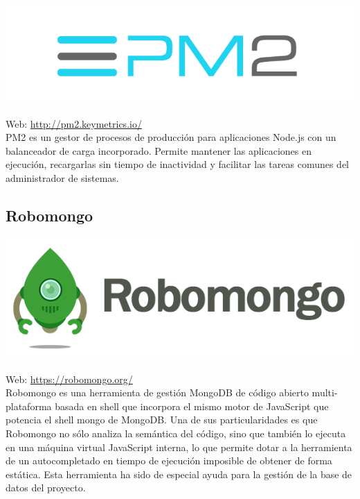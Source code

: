 \begin{center}
\includegraphics[scale=0.4]{imagenes/pm2-logo.png}
\end{center}

Web: \url{http://pm2.keymetrics.io/}\\


PM2 es un gestor de procesos de producción para aplicaciones Node.js con un balanceador de carga incorporado. Permite mantener las aplicaciones en ejecución, recargarlas sin tiempo de inactividad
y facilitar las tareas comunes del administrador de sistemas.


\subsection{ Robomongo }

\begin{center}
\includegraphics[scale=0.5]{imagenes/robomongo-logo.png}
\end{center}

Web: \url{https://robomongo.org/}\\


Robomongo es una herramienta de gestión MongoDB de código abierto multi-plataforma basada en shell que incorpora el mismo motor de JavaScript que potencia el shell mongo de MongoDB.
Una de sus particularidades es que Robomongo no sólo analiza la semántica del código, sino que también lo ejecuta en una máquina virtual JavaScript interna, lo que permite dotar a la 
herramienta de un autocompletado en tiempo de ejecución imposible de obtener de forma estática. Esta herramienta ha sido de especial ayuda para la gestión de la base de datos del proyecto.\\


